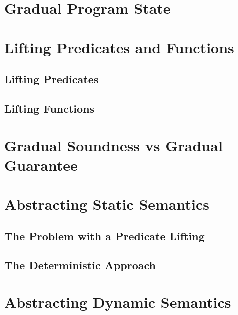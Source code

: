 \section{Gradual Program State}
\label{sec:gradual-program-state}


\section{Lifting Predicates and Functions}
\label{sec:lifting-predicates-and}


    \subsection{Lifting Predicates}
    \label{ssec:lifting-predicates}
    
    
    \subsection{Lifting Functions}
    \label{ssec:lifting-functions}
    

\section{Gradual Soundness vs Gradual Guarantee}
\label{ssec:gradual-soundness}


\section{Abstracting Static Semantics}
\label{sec:abstracting-static-semantics}

    
    \subsection{The Problem with a Predicate Lifting}
    \label{ssec:the-problem-with}
    
    
    \subsection{The Deterministic Approach}
    \label{ssec:the-deterministic-approach}
    

\section{Abstracting Dynamic Semantics}
\label{sec:abstracting-dynamic-semantics}

    
